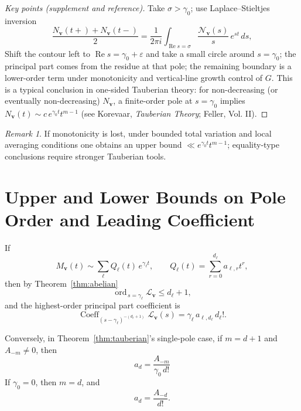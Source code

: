 \documentclass[11pt,a4paper]{article}
\theoremstyle{remark}
\newtheorem{remark}[theorem]{Remark}
\DeclareMathOperator{\Re}{Re}
\DeclareMathOperator{\ord}{ord}
\DeclareMathOperator{\Coeff}{Coeff}
\begin{document}
\begin{proof}[Key points (supplement and reference)]
Take $\sigma>\gamma_0$; use Laplace--Stieltjes inversion
\begin{equation}
\frac{N_{\mathbf{v}}(t+)+N_{\mathbf{v}}(t-)}{2}
=\frac{1}{2\pi i}\int_{\Re s=\sigma}\frac{\mathscr{N}_{\mathbf{v}}(s)}{s}\,e^{s t}\,ds,
\end{equation}
Shift the contour left to $\Re s=\gamma_0+\varepsilon$ and take a small circle around $s=\gamma_0$; the principal part comes from the residue at that pole; the remaining boundary is a lower-order term under monotonicity and vertical-line growth control of $G$. This is a typical conclusion in one-sided Tauberian theory: for non-decreasing (or eventually non-decreasing) $N_{\mathbf{v}}$, a finite-order pole at $s=\gamma_0$ implies $N_{\mathbf{v}}(t)\sim c\,e^{\gamma_0 t}t^{m-1}$ (see Korevaar, \textit{Tauberian Theory}; Feller, Vol. II).
\end{proof}

\begin{remark}
If monotonicity is lost, under bounded total variation and local averaging conditions one obtains an upper bound $\ll e^{\gamma_0 t}t^{m-1}$; equality-type conclusions require stronger Tauberian tools.
\end{remark}

\section{Upper and Lower Bounds on Pole Order and Leading Coefficient}

If
\begin{equation}
M_{\mathbf{v}}(t)\sim \sum_{\ell} Q_\ell(t)\,e^{\gamma_\ell t},\qquad
Q_\ell(t)=\sum_{r=0}^{d_\ell} a_{\ell,r} t^r,
\end{equation}
then by Theorem~\ref{thm:abelian}
\begin{equation}
\ord_{\,s=\gamma_\ell}\mathcal{L}_{\mathbf{v}}\le d_\ell+1,
\end{equation}
and the highest-order principal part coefficient is
\begin{equation}
\Coeff_{(s-\gamma_\ell)^{-(d_\ell+1)}}\mathcal{L}_{\mathbf{v}}(s)
=\gamma_\ell\,a_{\ell,d_\ell}\,d_\ell! .
\end{equation}

Conversely, in Theorem~\ref{thm:tauberian}'s single-pole case, if $m=d+1$ and $A_{-m}\neq0$, then
\begin{equation}
a_{d}=\frac{A_{-m}}{\gamma_0\,d!}
\end{equation}
If $\gamma_0=0$, then $m=d$, and
\begin{equation}
a_{d}=\frac{A_{-d}}{d!}.
\end{equation}
\end{document}
